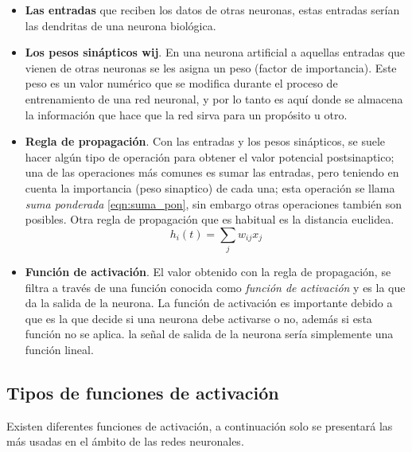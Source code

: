 \begin{itemize}
\item \textbf{Las entradas} que reciben los datos de otras neuronas, estas entradas ser\'{i}an las dendritas de una neurona biol\'{o}gica.
\item \textbf{Los pesos sin\'{a}pticos wij}. En una neurona artificial a aquellas entradas que vienen de otras neuronas se les asigna un peso (factor de importancia). Este peso es un valor num\'{e}rico que se modifica durante el proceso de entrenamiento de una red neuronal, y por lo tanto es aqu\'{i} donde se almacena la informaci\'{o}n que hace que la red sirva para un prop\'{o}sito u otro.
\item \textbf{Regla de propagaci\'{o}n}. Con las entradas y los pesos sin\'{a}pticos, se suele hacer alg\'{u}n tipo de operaci\'{o}n para obtener el valor potencial postsinaptico; una de las operaciones m\'{a}s comunes es sumar las entradas, pero teniendo en cuenta la importancia (peso sinaptico) de cada una; esta operaci\'{o}n se llama \textit{suma ponderada} \ref{eqn:suma_pon}, sin embargo otras operaciones tambi\'{e}n son posibles. Otra regla de propagaci\'{o}n que es habitual es la distancia euclidea.
\begin{equation}
h_{i}(t) = \sum_{j}{w_{ij}x_{j}}
\label{eqn:suma_pon}
\end{equation}
\item \textbf{Funci\'{o}n de activaci\'{o}n}. El valor obtenido con la regla de propagaci\'{o}n, se filtra a trav\'{e}s de una funci\'{o}n conocida como \textit{funci\'{o}n de activaci\'{o}n} y es la que da la salida de la neurona. La función de activación es importante debido a que es la que decide si una neurona debe activarse o no, adem\'{a}s si esta función no se aplica. la señal de salida de la neurona sería simplemente una función lineal.
\end{itemize}

\subsection{Tipos de funciones de activaci\'{o}n}

Existen diferentes funciones de activaci\'{o}n, a continuaci\'{o}n solo se presentar\'{a} las m\'{a}s usadas en el \'{a}mbito de las redes neuronales.

